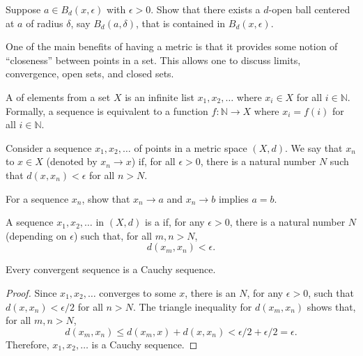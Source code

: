 \begin{problem}
Suppose $a \in B_d(x, \epsilon)$ with $\epsilon > 0$.
Show that there exists a $d$-open ball centered at $a$ of radius $\delta$, say $B_d(a, \delta)$, that is contained in $B_d(x, \epsilon)$.
\end{problem}

One of the main benefits of having a metric is that it provides some notion of ``closeness'' between points in a set.
This allows one to discuss limits, convergence, open sets, and closed sets.

\begin{definition}
A  of elements from a set $X$ is an infinite list $x_1,x_2,\ldots$ where $x_i \in X$ for all $i\in \mathbb{N}$.
Formally, a sequence is equivalent to a function $f \colon \mathbb{N} \rightarrow X$ where $x_i = f(i)$ for all $i\in \mathbb{N}$.
\end{definition}

\begin{definition}
\label{definition_metspace_converge}
Consider a sequence $x_1, x_2, \ldots$ of points in a metric space $(X,d)$.
We say that $x_n$  to $x\in X$ (denoted by $x_n \to x$)  if, for all $\epsilon >0$, there is a natural number $N$ such that $d(x,x_n) < \epsilon$ for all $n>N$.
\end{definition}

\begin{problem}
For a sequence $x_n$, show that $x_n \to a$ and $x_n \to b$ implies $a=b$.
\end{problem}

\begin{definition}
A sequence $x_1,x_2,\ldots$ in $(X,d)$ is a  if, for any $\epsilon >0$, there is a natural number $N$ (depending on $\epsilon$) such that, for all $m,n > N$,
\begin{equation*}
d \left( x_m, x_n \right) < \epsilon.
\end{equation*}
\end{definition}



\begin{theorem}
Every convergent sequence is a Cauchy sequence.
\end{theorem}
\begin{proof}
Since $x_1,x_2,\ldots$ converges to some $x$, there is an $N$, for any $\epsilon>0$, such that $d(x,x_n)<\epsilon /2$ for all $n>N$.
The triangle inequality for $d(x_m,x_n)$ shows that, for all $m,n>N$,
\[ d(x_m,x_n)\leq d(x_m,x) + d(x,x_n) < \epsilon/2 + \epsilon/2 = \epsilon. \]
Therefore, $x_1,x_2,\ldots$ is a Cauchy sequence.
\end{proof}

